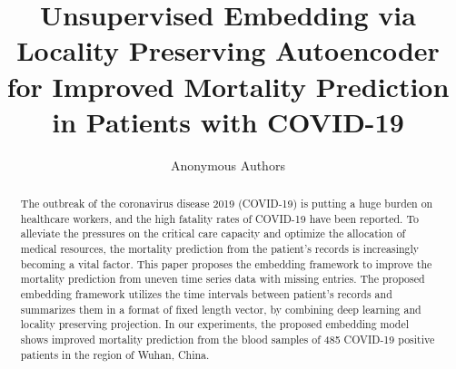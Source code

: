 \documentclass[letterpaper]{article} %
\title{Unsupervised Embedding via Locality Preserving Autoencoder for Improved Mortality Prediction in Patients with COVID-19}
\author{
    Anonymous Authors
}
\begin{document}
\maketitle

\begin{abstract}
    The outbreak of the coronavirus disease 2019 (COVID-19) is putting a huge burden on healthcare workers, and the high fatality rates of COVID-19 have been reported. To alleviate the pressures on the critical care capacity and optimize the allocation of medical resources, the mortality prediction from the patient's records is increasingly becoming a vital factor. This paper proposes the embedding framework to improve the mortality prediction from uneven time series data with missing entries. The proposed embedding framework utilizes the time intervals between patient's records and summarizes them in a format of fixed length vector, by combining deep learning and locality preserving projection. 
    In our experiments, the proposed embedding model shows improved mortality prediction from the blood samples of 485 COVID-19 positive patients in the region of Wuhan, China.
\end{abstract}
\end{document}
